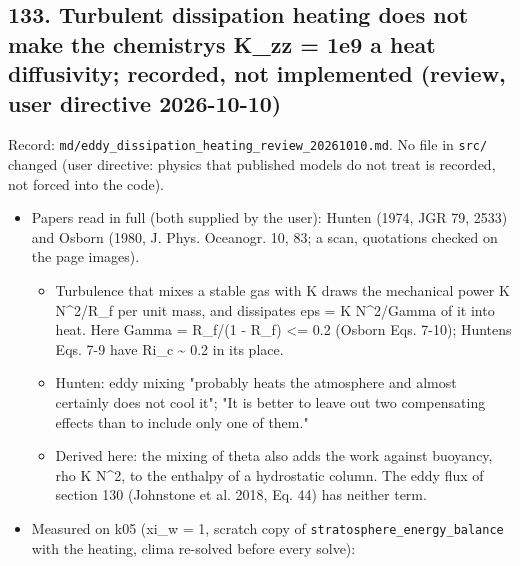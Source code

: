 \documentclass[english,a4paper]{my_memo}
\providecommand{\tightlist}{\setlength{\itemsep}{0pt}\setlength{\parskip}{0pt}}
\begin{document}
\subsection{133. Turbulent dissipation heating does not make the chemistry\textquotesingle s K\_zz = 1e9 a heat diffusivity; recorded, not implemented (review, user directive 2026-10-10)}\label{133-turbulent-dissipation-heating-does-not-make-the-chemistrys-k_zz--1e9-a-heat-diffusivity-recorded-not-implemented-review-user-directive-2026-10-10}

Record: \texttt{md/eddy\_dissipation\_heating\_review\_20261010.md}. No file in \texttt{src/}
changed (user directive: physics that published models do not treat is
recorded, not forced into the code).

\begin{itemize}
\tightlist
\item
  Papers read in full (both supplied by the user): Hunten (1974, JGR 79,
  2533) and Osborn (1980, J. Phys. Oceanogr. 10, 83; a scan, quotations
  checked on the page images).

  \begin{itemize}
  \tightlist
  \item
    Turbulence that mixes a stable gas with K draws the mechanical power
    K N\^{}2/R\_f per unit mass, and dissipates eps = K N\^{}2/Gamma of it into heat.
    Here Gamma = R\_f/(1 - R\_f) \textless= 0.2 (Osborn Eqs. 7-10); Hunten\textquotesingle s
    Eqs. 7-9 have Ri\_c \textasciitilde{} 0.2 in its place.
  \item
    Hunten: eddy mixing "probably heats the atmosphere and almost certainly
    does not cool it"; "It is better to leave out two compensating effects
    than to include only one of them."
  \item
    Derived here: the mixing of theta also adds the work against buoyancy,
    rho K N\^{}2, to the enthalpy of a hydrostatic column. The eddy flux of
    section 130 (Johnstone et al. 2018, Eq. 44) has neither term.
  \end{itemize}
\item
  Measured on k05 (xi\_w = 1, scratch copy of
  \texttt{stratosphere\_energy\_balance} with the heating, clima re-solved before
  every solve):


\end{itemize}
\end{document}

